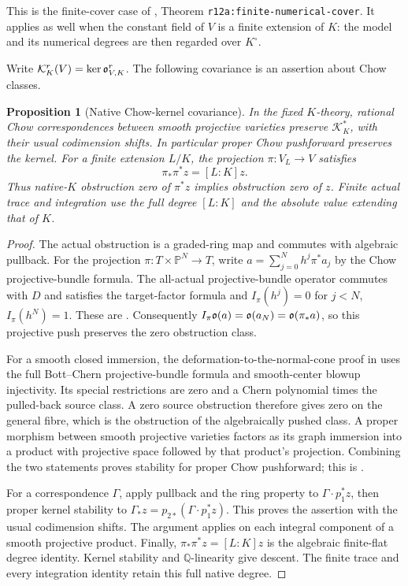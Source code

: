 \documentclass[11pt,a4paper]{article}
\newtheorem{proposition}[theorem]{Proposition}
\theoremstyle{definition}
\theoremstyle{remark}\newtheorem{remark}[theorem]{Remark}
\numberwithin{equation}{section}
\newcommand{\Q}{\mathbb Q}\newcommand{\R}{\mathbb R}\newcommand{\C}{\mathbb C}
\newcommand{\PP}{\mathbb P}\newcommand{\LL}{\mathbb L}
\begin{document}
This is the finite-cover case of \cite{InternalNumerical}, Theorem
\texttt{r12a:finite-numerical-cover}. It applies as well when the
constant field of $V$ is a finite extension of $K$: the model and its
numerical degrees are then regarded over $K^\circ$.

Write $\mathcal K_K^r(V)=\ker\mathfrak o^r_{V,K}$. The following covariance
is an assertion about Chow classes.

\begin{proposition}[Native Chow-kernel covariance]\label{prop:covariance}
In the fixed $K$-theory, rational Chow correspondences between smooth
projective varieties preserve $\mathcal K_K^*$, with their usual
codimension shifts. In particular proper Chow pushforward preserves
the kernel. For a finite extension $L/K$, the projection
$\pi:V_L\to V$ satisfies
\[
          \pi_*\pi^*z=[L:K]z.
\]
Thus native-$K$ obstruction zero of $\pi^*z$ implies obstruction zero
of $z$. Finite actual trace and integration use the full degree
$[L:K]$ and the absolute value extending that of $K$.
\end{proposition}
\begin{proof}
The actual obstruction is a graded-ring map and commutes with
algebraic pullback. For the projection $\pi:T\times\PP^N\to T$,
write $a=\sum_{j=0}^N h^j\pi^*a_j$ by the Chow projective-bundle
formula. The all-actual projective-bundle operator commutes with $D$
and satisfies the target-factor formula and
$I_\pi(h^j)=0$ for $j<N$, $I_\pi(h^N)=1$.
These are \cite[\texttt{r16out:line}, \texttt{r16out:bundle}]{InternalProjective}.
Consequently $I_\pi\mathfrak o(a)=\mathfrak o(a_N)=\mathfrak o(\pi_*a)$, so this
projective push preserves the zero obstruction class.

For a smooth closed immersion, the deformation-to-the-normal-cone
proof in \cite[\texttt{r16gi:detection}, \texttt{r16gi:kernel}]{InternalProjective}
uses the full Bott--Chern projective-bundle formula and smooth-center
blowup injectivity. Its special restrictions are zero and a Chern
polynomial times the pulled-back source class. A zero source
obstruction therefore gives zero on the general fibre, which is
the obstruction of the algebraically pushed class. A proper morphism
between smooth projective varieties factors as its graph immersion
into a product with projective space followed by that product's
projection. Combining the two statements proves stability for proper
Chow pushforward; this is \cite[\texttt{r16cov:proper-push}]{InternalCovariance}.

For a correspondence $\Gamma$, apply pullback and the ring property
to $\Gamma\cdot p_1^*z$, then proper kernel stability to
$\Gamma_*z=p_{2*}(\Gamma\cdot p_1^*z)$. This proves the assertion
with the usual codimension shifts. The argument applies on each
integral component of a smooth projective product. Finally,
$\pi_*\pi^*z=[L:K]z$ is the algebraic finite-flat degree identity.
Kernel stability and $\Q$-linearity give descent. The finite trace
and every integration identity retain this full native degree.
\end{proof}
\end{document}

